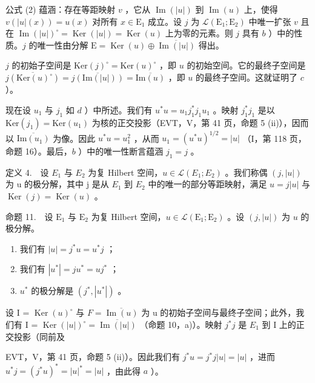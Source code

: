 公式 (2) 蕴涵：存在等距映射 \(v\) ，它从 \(\operatorname{Im}(|u|)\) 到 \(\operatorname{Im}(u)\) 上，使得 \(v(|u|(x)) = u(x)\) 对所有 \(x \in \mathrm{E}_1\) 成立。设 \(j\) 为 \(\mathcal{L}(\mathrm{E}_1; \mathrm{E}_2)\) 中唯一扩张 \(v\) 且在 \(\operatorname{Im}(|u|)^{\circ} = \operatorname{Ker}(|u|) = \operatorname{Ker}(u)\) 上为零的元素。则 \(j\) 具有 \(b\) ）中的性质。\(j\) 的唯一性由分解 \(\mathrm{E} = \operatorname{Ker}(u) \oplus \overline{\operatorname{Im}(|u|)}\) 得出。

\(j\) 的初始子空间是 \(\mathrm{Ker}(j)^{\circ} = \mathrm{Ker}(u)^{\circ}\) ，即 \(u\) 的初始空间。它的最终子空间是 \(\overline{j(\mathrm{Ker}(u)^{\circ})} = \overline{j(\mathrm{Im}(|u|))} = \overline{\mathrm{Im}(u)}\) ，即 \(u\) 的最终子空间。这就证明了 \(c\) ）。

现在设 \(u_1\) 与 \(j_1\) 如 \(d\) ）中所述。我们有 \(u^*u = u_1j_1^*j_1u_1\) 。映射 \(j_1^*j_1\) 是以 \(\text{Ker}(j_1) = \text{Ker}(u_1)\) 为核的正交投影（EVT，V，第 41 页，命题 5 (ii)），因而以 \(\overline{\text{Im}(u_1)}\) 为像。因此 \(u^*u = u_1^2\) ，从而 \(u_1 = (u^*u)^{1/2} = |u|\) （I，第 118 页，命题 16）。最后，\(b\) ）中的唯一性断言蕴涵 \(j_1 = j\) 。

定义 4.　设 \(E_{1}\) 与 \(E_{2}\) 为复 Hilbert 空间，\(u \in \mathcal{L}(E_{1}; E_{2})\) 。我们称偶 \((j, |u|)\) 为 u 的极分解，其中 j 是从 \(E_{1}\) 到 \(E_{2}\) 中的唯一的部分等距映射，满足 \(u = j|u|\) 与 \(\operatorname{Ker}(j) = \operatorname{Ker}(u)\) 。

命题 11.　设 \(\mathrm{E}_1\) 与 \(\mathrm{E}_2\) 为复 Hilbert 空间，\(u \in \mathcal{L}(\mathrm{E}_1; \mathrm{E}_2)\) 。设 \((j, |u|)\) 为 \(u\) 的极分解。

\begin{enumerate}
\def\labelenumi{\alph{enumi})}
\item
  我们有 \(|u| = j^{*}u = u^{*}j\) ；
\item
  我们有 \(|u^{*}| = j u^{*} = u j^{*}\) ；
\item
  \(u^{*}\) 的极分解是 \((j^{*}, |u^{*}|)\) 。
\end{enumerate}

设 I = \(\operatorname{Ker}(u)^{\circ}\) 与 \(F = \overline{\operatorname{Im}(u)}\) 为 u 的初始子空间与最终子空间；此外，我们有 I = \(\operatorname{Ker}(|u|)^{\circ} = \overline{\operatorname{Im}(|u|)}\) （命题 10，a)）。映射 \(j^{*}j\) 是 \(E_{1}\) 到 I 上的正交投影（同前及

EVT，V，第 41 页，命题 5 (ii)）。因此我们有 \(j^{*}u = j^{*}j|u| = |u|\) ，进而 \(u^{*}j = (j^{*}u)^{*} = |u|^{*} = |u|\) ，由此得 \(a\) ）。

